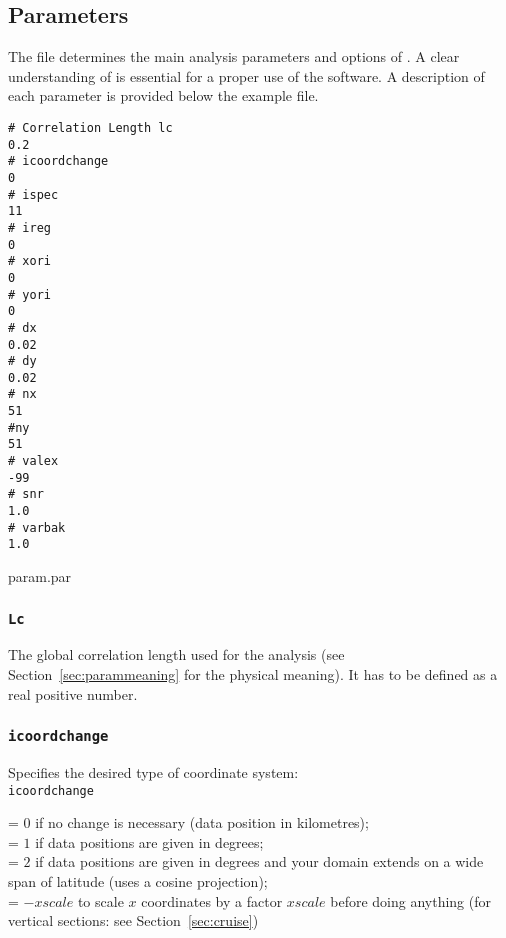 \subsection{Parameters\label{sec:param.par}}

The file  determines the main analysis parameters and options of \diva. A clear understanding of is essential for a proper use of the software. A description of each parameter is provided below the example file.

\begin{exfile}[htpb]
\begin{verbatim}
# Correlation Length lc
0.2
# icoordchange
0
# ispec
11
# ireg
0
# xori
0
# yori
0
# dx
0.02
# dy
0.02
# nx
51
#ny
51
# valex
-99
# snr
1.0
# varbak
1.0
\end{verbatim}
\caption{param.par\label{paramfile}}
\end{exfile}


\subsubsection{\texttt{Lc}}

The global correlation length  used for the analysis (see Section~\ref{sec:parammeaning} for the physical meaning). It has to be defined as a real positive number. 

\subsubsection{\texttt{icoordchange}\label{sec:icoord}}


Specifies the desired type of coordinate system:\\

\texttt{icoordchange} \begin{minipage}[t]{.7\textwidth} = $0$ if no change is necessary (data position in kilometres);\\
                                                        = $1$ if data positions are given in degrees;\\
                                                        = $2$ if data positions are given in degrees and your domain extends on a wide span of latitude                                                           (uses a cosine projection);\\
                                                        = $-xscale$ to scale $x$ coordinates by a factor $xscale$ before doing anything (for vertical sections: see Section~\ref{sec:cruise})
                      \end{minipage}
                      

